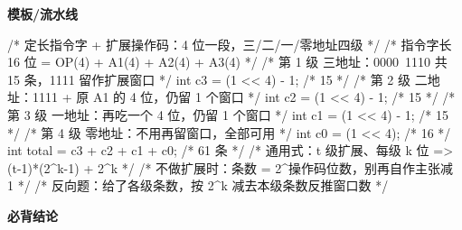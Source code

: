 \documentclass[10pt,a4paper]{ctexart}
\begin{document}

\textbf{模板/流水线}

\begin{codebox}
/* 定长指令字 + 扩展操作码：4 位一段，三/二/一/零地址四级 */
/* 指令字长 16 位 = OP(4) + A1(4) + A2(4) + A3(4) */
/* 第 1 级 三地址：0000~1110 共 15 条，1111 留作扩展窗口 */
int c3 = (1 << 4) - 1;                 /* 15 */
/* 第 2 级 二地址：1111 + 原 A1 的 4 位，仍留 1 个窗口 */
int c2 = (1 << 4) - 1;                 /* 15 */
/* 第 3 级 一地址：再吃一个 4 位，仍留 1 个窗口 */
int c1 = (1 << 4) - 1;                 /* 15 */
/* 第 4 级 零地址：不用再留窗口，全部可用 */
int c0 = (1 << 4);                     /* 16 */
int total = c3 + c2 + c1 + c0;         /* 61 条 */
/* 通用式：t 级扩展、每级 k 位 => (t-1)*(2^k-1) + 2^k */
/* 不做扩展时：条数 = 2^操作码位数，别再自作主张减 1 */
/* 反向题：给了各级条数，按 2^k 减去本级条数反推窗口数 */
\end{codebox}




\textbf{必背结论}
\end{document}

